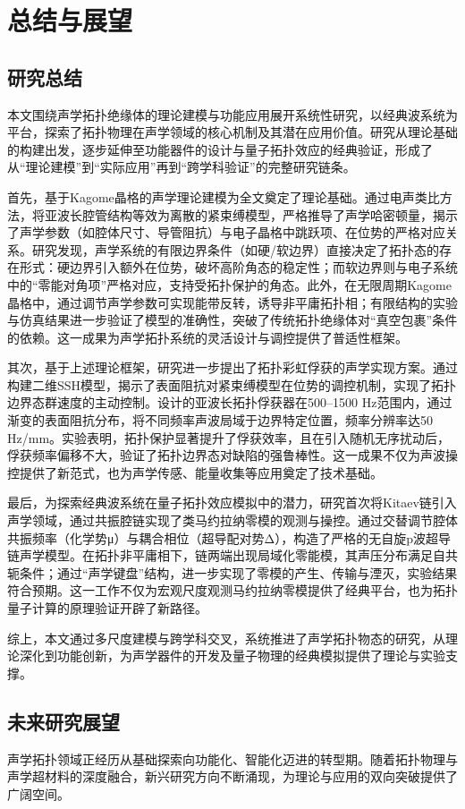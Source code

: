 \chapter{总结与展望}
\section{研究总结}
本文围绕声学拓扑绝缘体的理论建模与功能应用展开系统性研究，以经典波系统为平台，探索了拓扑物理在声学领域的核心机制及其潜在应用价值。研究从理论基础的构建出发，逐步延伸至功能器件的设计与量子拓扑效应的经典验证，形成了从“理论建模”到“实际应用”再到“跨学科验证”的完整研究链条。

首先，基于Kagome晶格的声学理论建模为全文奠定了理论基础。通过电声类比方法，将亚波长腔管结构等效为离散的紧束缚模型，严格推导了声学哈密顿量，揭示了声学参数（如腔体尺寸、导管阻抗）与电子晶格中跳跃项、在位势的严格对应关系。研究发现，声学系统的有限边界条件（如硬/软边界）直接决定了拓扑态的存在形式：硬边界引入额外在位势，破坏高阶角态的稳定性；而软边界则与电子系统中的“零能对角项”严格对应，支持受拓扑保护的角态。此外，在无限周期Kagome晶格中，通过调节声学参数可实现能带反转，诱导非平庸拓扑相；有限结构的实验与仿真结果进一步验证了模型的准确性，突破了传统拓扑绝缘体对“真空包裹”条件的依赖。这一成果为声学拓扑系统的灵活设计与调控提供了普适性框架。

其次，基于上述理论框架，研究进一步提出了拓扑彩虹俘获的声学实现方案。通过构建二维SSH模型，揭示了表面阻抗对紧束缚模型在位势的调控机制，实现了拓扑边界态群速度的主动控制。设计的亚波长拓扑俘获器在500–1500 Hz范围内，通过渐变的表面阻抗分布，将不同频率声波局域于边界特定位置，频率分辨率达50 Hz/mm。实验表明，拓扑保护显著提升了俘获效率，且在引入随机无序扰动后，俘获频率偏移不大，验证了拓扑边界态对缺陷的强鲁棒性。这一成果不仅为声波操控提供了新范式，也为声学传感、能量收集等应用奠定了技术基础。

最后，为探索经典波系统在量子拓扑效应模拟中的潜力，研究首次将Kitaev链引入声学领域，通过共振腔链实现了类马约拉纳零模的观测与操控。通过交替调节腔体共振频率（化学势μ）与耦合相位（超导配对势Δ），构造了严格的无自旋p波超导链声学模型。在拓扑非平庸相下，链两端出现局域化零能模，其声压分布满足自共轭条件；通过“声学键盘”结构，进一步实现了零模的产生、传输与湮灭，实验结果符合预期。这一工作不仅为宏观尺度观测马约拉纳零模提供了经典平台，也为拓扑量子计算的原理验证开辟了新路径。

综上，本文通过多尺度建模与跨学科交叉，系统推进了声学拓扑物态的研究，从理论深化到功能创新，为声学器件的开发及量子物理的经典模拟提供了理论与实验支撑。

\section{未来研究展望}
声学拓扑领域正经历从基础探索向功能化、智能化迈进的转型期。随着拓扑物理与声学超材料的深度融合，新兴研究方向不断涌现，为理论与应用的双向突破提供了广阔空间。

